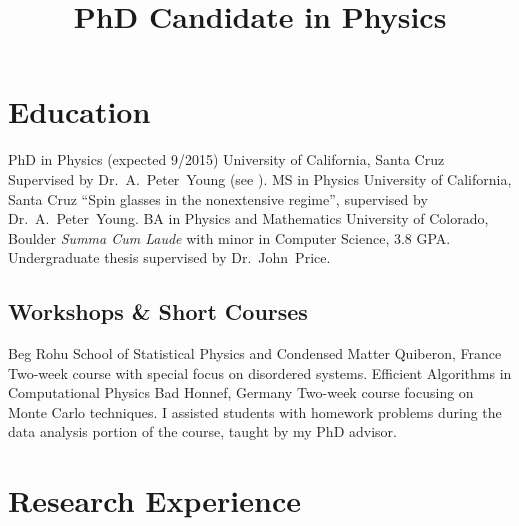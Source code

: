 \documentclass{cv}
\title{PhD Candidate in Physics}
\def\Peter{Dr.~A.~Peter~Young}
\def\John{Dr.~John~Price}
\begin{document}
\maketitle
\vfill

\section{Education}

\begin{cvjobs}
    {PhD in Physics \textnormal{(expected 9/2015)}}
    {University of California, Santa Cruz}
    {Supervised by \Peter{} (see ).}
    {MS in Physics}
    {University of California, Santa Cruz}
    {``Spin glasses in the nonextensive regime'',
     supervised by \Peter.}
    {BA in Physics and Mathematics}
    {University of Colorado, Boulder}
    {\textit{Summa Cum Laude} with minor in Computer Science, 3.8 GPA. \\
     Undergraduate thesis supervised by \John.}
\end{cvjobs}

\subsection{Workshops \& Short Courses}

\begin{cvjobs}
    {Beg Rohu School of Statistical Physics and Condensed Matter}
    {Quiberon, France}
    {Two-week course with special focus on disordered systems.}
    {Efficient Algorithms in Computational Physics}
    {Bad Honnef, Germany}
    {Two-week course focusing on Monte Carlo techniques. I assisted students with
     homework problems during the data analysis portion of the course, taught by
     my PhD advisor.} 
\end{cvjobs}

\section{Research Experience}
\label{sec:research}
\end{document}
